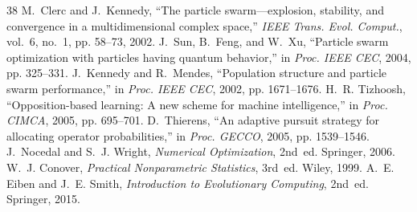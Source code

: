\documentclass[conference,letterpaper]{IEEEtran}
\begin{document}
\begin{thebibliography}{38}
 M.~Clerc and J.~Kennedy, ``The particle swarm---explosion, stability, and convergence in
a multidimensional complex space,'' \emph{IEEE Trans. Evol. Comput.}, vol.~6, no.~1, pp. 58--73, 2002.
 J.~Sun, B.~Feng, and W.~Xu, ``Particle swarm optimization with particles having quantum
behavior,'' in \emph{Proc. IEEE CEC}, 2004, pp. 325--331.
 J.~Kennedy and R.~Mendes, ``Population structure and particle swarm performance,'' in
\emph{Proc. IEEE CEC}, 2002, pp. 1671--1676.
 H.~R. Tizhoosh, ``Opposition-based learning: A new scheme for machine intelligence,''
in \emph{Proc. CIMCA}, 2005, pp. 695--701.
 D.~Thierens, ``An adaptive pursuit strategy for allocating operator probabilities,''
in \emph{Proc. GECCO}, 2005, pp. 1539--1546.
 J.~Nocedal and S.~J. Wright, \emph{Numerical Optimization}, 2nd~ed. Springer, 2006.
 W.~J. Conover, \emph{Practical Nonparametric Statistics}, 3rd~ed. Wiley, 1999.
 A.~E. Eiben and J.~E. Smith, \emph{Introduction to Evolutionary Computing}, 2nd~ed.
Springer, 2015.
\end{thebibliography}
\end{document}
